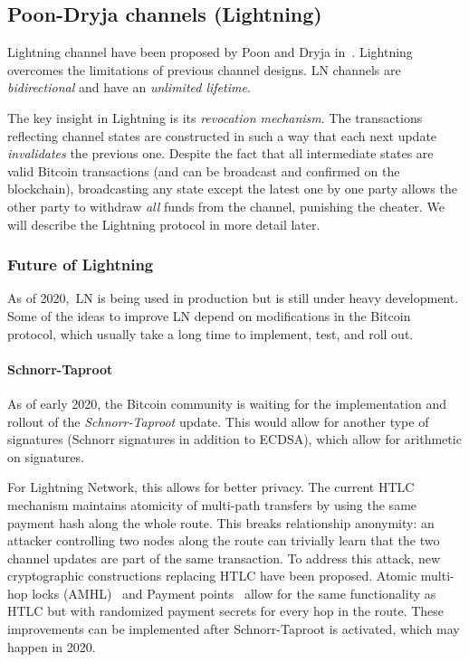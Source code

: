 \subsection{Poon-Dryja channels (Lightning)}

Lightning channel have been proposed by Poon and Dryja in~\cite{Poon2016}.
Lightning overcomes the limitations of previous channel designs.
LN channels are \textit{bidirectional} and have an \textit{unlimited lifetime}.

The key insight in Lightning is its \textit{revocation mechanism}.
The transactions reflecting channel states are constructed in such a way that each next update \textit{invalidates} the previous one.
Despite the fact that all intermediate states are valid Bitcoin transactions (and can be broadcast and confirmed on the blockchain), broadcasting any state except the latest one by one party allows the other party to withdraw \textit{all} funds from the channel, punishing the cheater.
We will describe the Lightning protocol in more detail later.


\subsubsection{Future of Lightning}

As of 2020,~LN is being used in production but is still under heavy development.
Some of the ideas to improve LN depend on modifications in the Bitcoin protocol, which usually take a long time to implement, test, and roll out.

\paragraph{Schnorr-Taproot}
As of early 2020, the Bitcoin community is waiting for the implementation and rollout of the \textit{Schnorr-Taproot} update.
This would allow for another type of signatures (Schnorr signatures in addition to ECDSA), which allow for arithmetic on signatures.

For Lightning Network, this allows for better privacy.
The current HTLC mechanism maintains atomicity of multi-path transfers by using the same payment hash along the whole route.
This breaks relationship anonymity: an attacker controlling two nodes along the route can trivially learn that the two channel updates are part of the same transaction.
To address this attack, new cryptographic constructions replacing HTLC have been proposed.
Atomic multi-hop locks (AMHL)~\cite{Malavolta2019} and Payment points~\cite{Kohen2019} allow for the same functionality as HTLC but with randomized payment secrets for every hop in the route.
These improvements can be implemented after Schnorr-Taproot is activated, which may happen in 2020.

